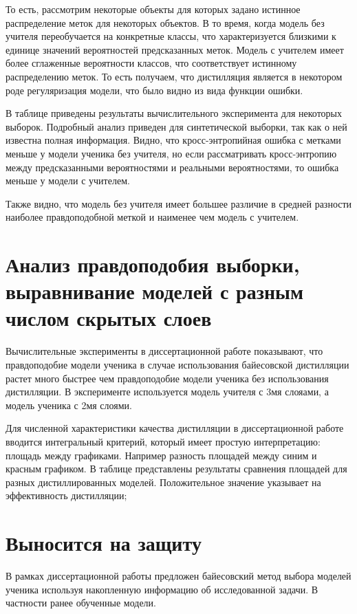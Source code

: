 \documentclass[10pt, twoside]{article}
\begin{document}
То есть, рассмотрим некоторые объекты для которых задано истинное распределение меток для некоторых объектов. В то время, когда модель без учителя переобучается на конкретные классы, что характеризуется близкими к единице значений вероятностей предсказанных меток. Модель с учителем имеет более сглаженные вероятности классов, что соответствует истинному распределению меток. То есть получаем, что дистилляция является в некотором роде регуляризация модели, что было видно из вида функции ошибки.

В таблице приведены результаты вычислительного эксперимента для некоторых выборок. Подробный анализ приведен для синтетической выборки, так как о ней известна полная информация. Видно, что кросс-энтропийная ошибка с метками меньше у модели ученика без учителя, но если рассматривать кросс-энтропию между предсказанными вероятностями и реальными вероятностями, то ошибка меньше у модели с учителем.

Также видно, что модель без учителя имеет большее различие в средней разности наиболее правдоподобной меткой и наименее чем модель с учителем.

\section{Анализ правдоподобия выборки, выравнивание моделей с разным числом скрытых слоев}

Вычислительные эксперименты в диссертационной работе показывают, что правдоподобие модели ученика в случае использования байесовской дистилляции растет много быстрее чем правдоподобие модели ученика без использования дистилляции. В эксперименте используется модель учителя с 3мя слояами, а модель ученика с 2мя слоями.

Для численной характеристики качества дистилляции в диссертационной работе вводится интегральный критерий, который имеет простую интерпретацию: площадь между графиками. Например разность площадей между синим и красным графиком. В таблице представлены результаты сравнения площадей для разных дистиллированных моделей. Положительное значение указывает на эффективность дистилляции;

\section{Выносится на защиту}
В рамках диссертационной работы предложен байесовский метод выбора моделей ученика используя накопленную информацию об исследованной задачи. В частности ранее обученные модели.
\end{document}
